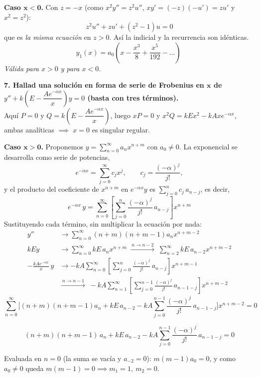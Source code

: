 \documentclass[11pt, a4paper]{article}
\begin{document}
\vspace{0.2cm}\noindent\textbf{Caso $\bm{x<0}$.} Con $z=-x$ (como $x^2y''=z^2u''$, $xy'=(-z)(-u')=zu'$ y $x^2=z^2$):
\[
z^2u''+zu'+(z^2-1)u=0
\]
que es \emph{la misma ecuación} en $z>0$. Así la indicial y la recurrencia son idénticas.\\

\[
\boxed{y_1(x)=a_0\left(x-\frac{x^3}{8}+\frac{x^5}{192}-\dots\right) \;}
\]
\textit{Válida para $x>0$ y para $x<0$.}

\noindent\textbf{7. Hallad una solución en forma de serie de Frobenius en $\bm{x}$ de $y''+k\left(E-\dfrac{Ae^{-\alpha x}}{x}\right)y=0$ (basta con tres términos).} \\
Aquí $P=0$ y $Q=k\left(E-\dfrac{Ae^{-\alpha x}}{x}\right)$, luego $xP=0$ y $x^2Q=kEx^2-kAxe^{-\alpha x}$, ambas analíticas $\implies$ $x=0$ es singular regular.

\vspace{0.2cm}\noindent\textbf{Caso $\bm{x>0}$.} Proponemos $y=\sum_{n=0}^\infty a_nx^{n+m}$ con $a_0\neq0$. La exponencial se desarrolla como serie de potencias,
\[
e^{-\alpha x}=\sum_{j=0}^\infty c_jx^j, \qquad c_j=\frac{(-\alpha)^j}{j!},
\]
y el producto del coeficiente de $x^{n+m}$ en $e^{-\alpha x}y$ es $\sum_{j=0}^{n}c_j\,a_{n-j}$, es decir,
\[
e^{-\alpha x}\,y=\sum_{n=0}^\infty\left[\sum_{j=0}^{n}\frac{(-\alpha)^j}{j!}\,a_{n-j}\right]x^{n+m}
\]
Sustituyendo cada término, sin multiplicar la ecuación por nada:
\begin{align*}
y'' &\to \sum_{n=0}^\infty (n+m)(n+m-1)a_nx^{n+m-2} \\
kEy &\to \sum_{n=0}^\infty kE\,a_nx^{n+m} \;\xrightarrow{\,n\to n-2\,}\; \sum_{n=2}^\infty kE\,a_{n-2}x^{n+m-2} \\
-\frac{kAe^{-\alpha x}}{x}\,y &\to -kA\sum_{n=0}^\infty\left[\sum_{j=0}^{n}\frac{(-\alpha)^j}{j!}\,a_{n-j}\right]x^{n+m-1} \\
&\xrightarrow{\,n\to n-1\,}\; -kA\sum_{n=1}^\infty\left[\sum_{j=0}^{n-1}\frac{(-\alpha)^j}{j!}\,a_{n-1-j}\right]x^{n+m-2}
\end{align*}
\[
\sum_{n=0}^\infty\Bigg[(n+m)(n+m-1)a_n+kE\,a_{n-2}-kA\sum_{j=0}^{n-1}\frac{(-\alpha)^j}{j!}\,a_{n-1-j}\Bigg]x^{n+m-2}=0
\]

\[
(n+m)(n+m-1)\,a_n+kE\,a_{n-2}-kA\sum_{j=0}^{n-1}\frac{(-\alpha)^j}{j!}\,a_{n-1-j}=0
\]

\smallskip\noindent Evaluada en $n=0$ (la suma se vacía y $a_{-2}=0$): $m(m-1)a_0=0$, y como $a_0\neq0$ queda  $m(m-1)=0 \implies m_1=1,\ m_2=0$.
\end{document}
